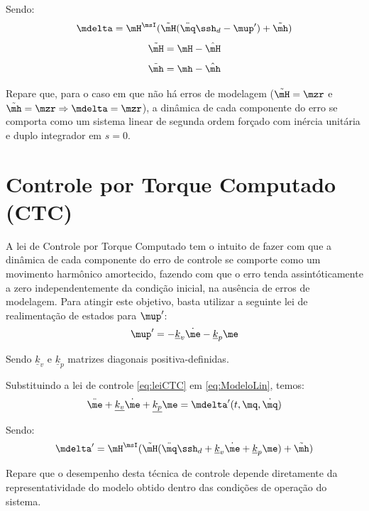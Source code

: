 \documentclass[]{politex}
\begin{document}
Sendo:
\begin{equation}
\mdelta = \mH^\msI( \tilde{\mH}(\ddot{\mq}\ssh_d - \mup') + \tilde{\mh} )
\end{equation}
\begin{equation} \label{eq:Htil}
\tilde{\mH} = \mH - \hat{\mH}
\end{equation} 
\begin{equation} \label{eq:htil}
\tilde{\mh} = \mh - \hat{\mh}
\end{equation}

Repare que, para o caso em que não há erros de modelagem ($\tilde{\mH} = \mzr$ e $\tilde{\mh} = \mzr \Rightarrow \mdelta = \mzr$), a dinâmica de cada componente do erro se comporta como um sistema linear de segunda ordem forçado com inércia unitária e duplo integrador em $s = 0$.

\section{Controle por Torque Computado (CTC)}\label{S05-05-01}

A lei de Controle por Torque Computado tem o intuito de fazer com que a dinâmica de cada componente do erro de controle se comporte como um movimento harmônico amortecido, fazendo com que o erro tenda assintóticamente a zero independentemente da condição inicial, na ausência de erros de modelagem. Para atingir este objetivo, basta utilizar a seguinte lei de realimentação de estados para $\mup'$:
\begin{equation} \label{eq:leiCTC}
\mup' = -\underline{k}_v \dot{\me} - \underline{k}_p \me
\end{equation}

Sendo $\underline{k}_v$ e $\underline{k}_p$ matrizes diagonais positiva-definidas.

Substituindo a lei de controle \eqref{eq:leiCTC} em \eqref{eq:ModeloLin}, temos:
\begin{equation}
\ddot{\me} + \underline{k_v} \dot{\me} + \underline{k_p} \me = \mdelta'(t,\mq,\dot{\mq})
\end{equation}

Sendo:
\begin{equation}
\mdelta' = \mH^\msI( \tilde{\mH}(\ddot{\mq}\ssh_d + \underline{k}_v \dot{\me} + \underline{k}_p \me ) + \tilde{\mh} )
\end{equation}

Repare que o desempenho desta técnica de controle depende diretamente da representatividade do modelo obtido dentro das condições de operação do sistema. 
\end{document}
